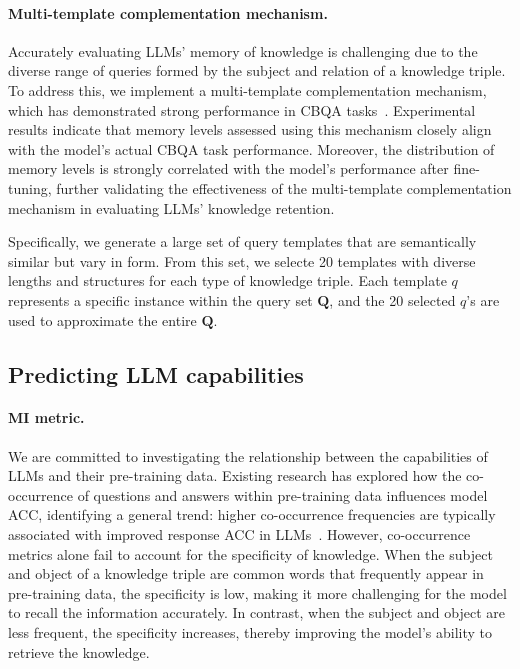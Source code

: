 \paragraph{Multi-template complementation mechanism.}
Accurately evaluating LLMs’ memory of knowledge is challenging due to the diverse range of queries formed by the subject and relation of a knowledge triple. To address this, we implement a multi-template complementation mechanism, which has demonstrated strong performance in CBQA tasks~\cite{DBLP:journals/corr/abs-2409-15825}. Experimental results indicate that memory levels assessed using this mechanism closely align with the model’s actual CBQA task performance. Moreover, the distribution of memory levels is strongly correlated with the model’s performance after fine-tuning, further validating the effectiveness of the multi-template complementation mechanism in evaluating LLMs’ knowledge retention.

Specifically, we generate a large set of query templates that are semantically similar but vary in form. From this set, we selecte 20 templates with diverse lengths and structures for each type of knowledge triple. Each template $q$ represents a specific instance within the query set \(\mathbf{Q}\), and the 20 selected $q$’s are used to approximate the entire \(\mathbf{Q}\).


% 
% 

\subsection{Predicting LLM capabilities}
\label{3-3}

\paragraph{MI metric.}
We are committed to investigating the relationship between the capabilities of LLMs and their pre-training data. Existing research has explored how the co-occurrence of questions and answers within pre-training data influences model ACC, identifying a general trend: higher co-occurrence frequencies are typically associated with improved response ACC in LLMs~\cite{DBLP:journals/corr/abs-2404-05405, DBLP:journals/jmlr/ChowdheryNDBMRBCSGSSTMRBTSPRDHPBAI23}. However, co-occurrence metrics alone fail to account for the specificity of knowledge. When the subject and object of a knowledge triple are common words that frequently appear in pre-training data, the specificity is low, making it more challenging for the model to recall the information accurately. In contrast, when the subject and object are less frequent, the specificity increases, thereby improving the model’s ability to retrieve the knowledge.

